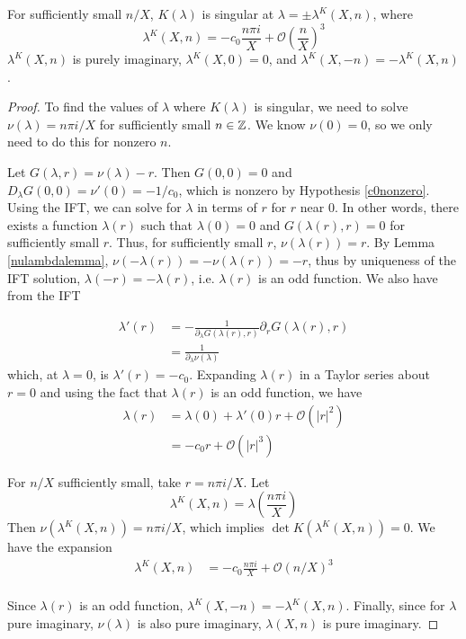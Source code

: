 \documentclass[thesis.tex]{subfiles}
\begin{document}
\begin{lemma}\label{Ksingularlemma}
For sufficiently small $n/X$, $K(\lambda)$ is singular at $\lambda = \pm \lambda^K(X,n)$, where
\begin{equation}\label{lambdaK}
\lambda^K(X,n)
= -c_0 \frac{n \pi i }{X} + \mathcal{O}\left( \frac{n}{X} \right)^3
\end{equation} 
$\lambda^K(X,n)$ is purely imaginary, $\lambda^K(X, 0) = 0$, and $\lambda^K(X, -n) = -\lambda^K(X, n)$.
\begin{proof}
To find the values of $\lambda$ where $K(\lambda)$ is singular, we need to solve $\nu(\lambda) = n \pi i/X$ for sufficiently small $n \in {\mathbb Z}$. We know $\nu(0) = 0$, so we only need to do this for nonzero $n$.

Let $G(\lambda, r) = \nu(\lambda) - r$. Then $G(0, 0) = 0$ and $D_\lambda G(0, 0) = \nu'(0) = -1/c_0$, which is nonzero by Hypothesis \ref{c0nonzero}. Using the IFT, we can solve for $\lambda$ in terms of $r$ for $r$ near 0. In other words, there exists a function $\lambda(r)$ such that $\lambda(0) = 0$ and $G(\lambda(r), r) = 0$ for sufficiently small $r$. Thus, for sufficiently small $r$, $\nu(\lambda(r)) = r$. By Lemma \ref{nulambdalemma}, $\nu(-\lambda(r)) = -\nu(\lambda(r)) = -r$, thus by uniqueness of the IFT solution, $\lambda(-r) = -\lambda(r)$, i.e. $\lambda(r)$ is an odd function. We also have from the IFT 

\begin{align*}
\lambda'(r) &= -\frac{1}{\partial_\lambda G(\lambda(r), r) } \partial_r G(\lambda(r), r) \\
&= \frac{1}{\partial_\lambda \nu(\lambda) } 
\end{align*}
which, at $\lambda = 0$, is $\lambda'(r) = -c_0$. Expanding $\lambda(r)$ in a Taylor series about $r = 0$ and using the fact that $\lambda(r)$ is an odd function, we have
\begin{align*}
\lambda(r) &= \lambda(0) + \lambda'(0) r + \mathcal{O}(|r|^2) \\
&= -c_0 r + \mathcal{O}(|r|^3)
\end{align*}

For $n/X$ sufficiently small, take $r = n \pi i / X$. Let 
\[
\lambda^K(X, n) = \lambda\left( \frac{n \pi i}{X} \right)
\]
Then $\nu(\lambda^K(X, n)) = n \pi i / X$, which implies $\det K(\lambda^K(X, n)) = 0$. We have the expansion
\begin{align*}
\lambda^K(X,n)
&= -c_0 \frac{n \pi i }{X} + \mathcal{O}(n/X)^3 \\
\end{align*} 

Since $\lambda(r)$ is an odd function, $\lambda^K(X,-n) = -\lambda^K(X,n)$. Finally, since for $\lambda$ pure imaginary, $\nu(\lambda)$ is also pure imaginary, $\lambda(X,n)$ is pure imaginary.
\end{proof}
\end{lemma}
\end{document}
